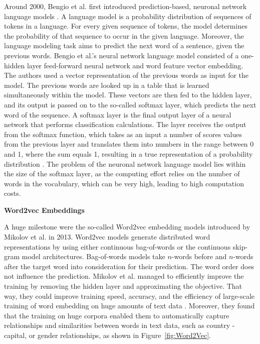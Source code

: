Around 2000, Bengio et al. first introduced prediction-based, neuronal network language models \cite{bengio2003neural}. A language model is a probability distribution of sequences of tokens in a language. For every given sequence of tokens, the model determines the probability of that sequence to occur in the given language. Moreover, the language modeling task aims to predict the next word of a sentence, given the previous words. Bengio et al.'s neural network language model consisted of a one-hidden layer feed-forward neural network and word feature vector embedding. %
The authors used a vector representation of the previous words as input for the model. The previous words are looked up in a table that is learned simultaneously within the model. These vectors are then fed to the hidden layer, and its output is passed on to the so-called softmax layer, which predicts the next word of the sequence. A softmax layer is the final output layer of a neural network that performs classification calculations. The layer receives the output from the softmax function, which takes as an input a number of scores values from the previous layer and translates them into numbers in the range between 0 and 1, where the sum equals 1, resulting in a true representation of a probability distribution \cite{buduma2017fundamentals}. 
The problem of the neuronal network language model lies within the size of the softmax layer, as the computing effort relies on the number of words in the vocabulary, which can be very high, leading to high computation costs.

\textbf{Word2vec Embeddings} 
\label{sec:Word2vec_embeddings}

A huge milestone were the so-called Word2vec embedding models introduced by Mikolov et al. in 2013. 
Word2vec models generate distributed word representations by using either continuous bag-of-words or the continuous skip-gram model architectures. 
Bag-of-words models take $n$-words before and $n$-words after the target word into consideration for their prediction. The word order does not influence the prediction. Mikolov et al. managed to efficiently improve the training by removing the hidden layer and approximating the objective. That way, they could improve training speed, accuracy, and the efficiency of large-scale training of word embedding on huge amounts of text data  \cite{mikolov2013efficient}.
Moreover, they found that the training on huge corpora enabled them to automatically capture relationships and similarities between words in text data, such as country - capital, or gender relationships, as shown in Figure~\ref{fig:Word2Vec}.

